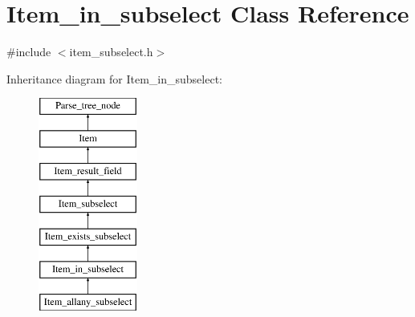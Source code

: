 \hypertarget{classItem__in__subselect}{}\section{Item\+\_\+in\+\_\+subselect Class Reference}
\label{classItem__in__subselect}


{\ttfamily \#include $<$item\+\_\+subselect.\+h$>$}

Inheritance diagram for Item\+\_\+in\+\_\+subselect\+:\begin{figure}[H]
\begin{center}
\leavevmode
\includegraphics[height=7.000000cm]{classItem__in__subselect}
\end{center}
\end{figure}
